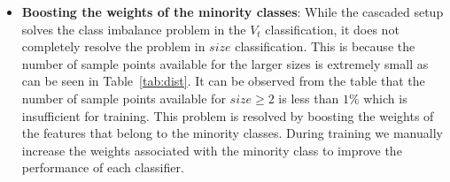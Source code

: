 \begin{itemize}
\begin{figure}[!t]
\begin{center}
 \label{fig:vtsvm}
 \end{center}
 \end{figure}
    \item\textbf{ Boosting the weights of the minority classes}: While the cascaded setup solves the class imbalance problem in the $V_t$ classification, it does not completely resolve the problem in ${size}$ classification. This is because the number of sample points available for the larger sizes is extremely small as can be seen in Table~\ref{tab:dist}. It can be observed from the table that the number of sample points available for $size \geq 2$ is less than $1\%$ which is insufficient for training. This problem is resolved by boosting the weights of the features that belong to the minority classes. During training we manually increase the weights associated with the minority class to improve the performance of each classifier. 
    
  
\end{itemize}










